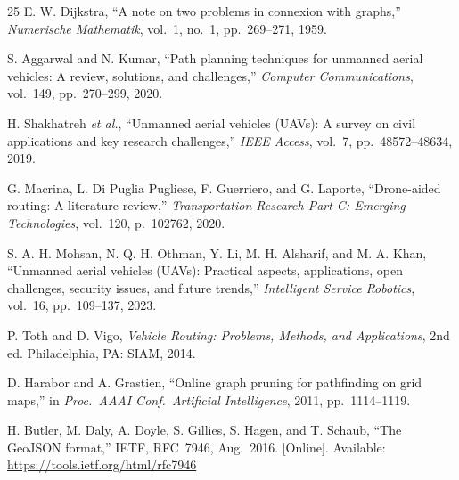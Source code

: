 \documentclass[11pt,a4paper,twocolumn]{article}
\begin{document}
\begin{thebibliography}{25}
E. W. Dijkstra, ``A note on two problems in connexion with graphs,'' \textit{Numerische Mathematik}, vol.~1, no.~1, pp.~269--271, 1959.

S. Aggarwal and N. Kumar, ``Path planning techniques for unmanned aerial vehicles: A review, solutions, and challenges,'' \textit{Computer Communications}, vol.~149, pp.~270--299, 2020.


H. Shakhatreh \textit{et al.}, ``Unmanned aerial vehicles (UAVs): A survey on civil applications and key research challenges,'' \textit{IEEE Access}, vol.~7, pp.~48572--48634, 2019.

G. Macrina, L. Di Puglia Pugliese, F. Guerriero, and G. Laporte, ``Drone-aided routing: A literature review,'' \textit{Transportation Research Part C: Emerging Technologies}, vol.~120, p.~102762, 2020.

S. A. H. Mohsan, N. Q. H. Othman, Y. Li, M. H. Alsharif, and M. A. Khan, ``Unmanned aerial vehicles (UAVs): Practical aspects, applications, open challenges, security issues, and future trends,'' \textit{Intelligent Service Robotics}, vol.~16, pp.~109--137, 2023.

P. Toth and D. Vigo, \textit{Vehicle Routing: Problems, Methods, and Applications}, 2nd ed. Philadelphia, PA: SIAM, 2014.

D. Harabor and A. Grastien, ``Online graph pruning for pathfinding on grid maps,'' in \textit{Proc.\ AAAI Conf.\ Artificial Intelligence}, 2011, pp.~1114--1119.

H. Butler, M. Daly, A. Doyle, S. Gillies, S. Hagen, and T. Schaub, ``The GeoJSON format,'' IETF, RFC~7946, Aug.\ 2016. [Online]. Available: \url{https://tools.ietf.org/html/rfc7946}

\end{thebibliography}
\end{document}
